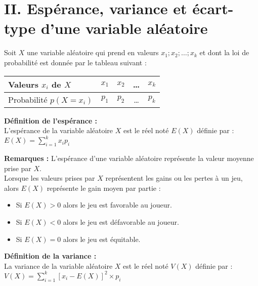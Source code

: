 \documentclass[11pt,a4paper]{article}
\begin{document}
\newpage

\section*{II. Espérance, variance et écart-type d'une variable aléatoire}

Soit $X$ une variable aléatoire qui prend en valeurs ${x_1;x_2;\dots;x_k}$ et dont la loi de probabilité est donnée par le tableau suivant :
\vspace{-12pt}

\begin{center}
    \renewcommand{\arraystretch}{1.6}
    \begin{tabular}{|l|c|c|c|c|}
        \hline
        Valeurs $x_i$ de $X$ & $x_1$      & $x_2$      & \quad\text{ }\dots\quad\text{ } & $x_k$      \\
        \hline
        Probabilité $p(X=x_i)$      & $p_1$ & $p_2$ & \quad\text{ }\dots\quad\text{ } & $p_k$ \\
        \hline
    \end{tabular}
\end{center}
\vspace*{8pt}

\begin{mdframed}[style=definitionStyle]
    \textbf{Définition de l'espérance :} ~\\
    L'espérance de la variable aléatoire $X$ est le réel noté $E(X)$ définie par :
    $\displaystyle E(X)=\sum_{i=1}^{k}x_ip_i$          
\end{mdframed}

\textbf{Remarques :} L'espérance d'une variable aléatoire représente la valeur moyenne prise par $X$. \\

Lorsque les valeurs prises par $X$ représentent les gains ou les pertes à un jeu, alors $E(X)$ représente le gain moyen par partie :
\vspace*{-4pt}
\begin{itemize}
    \item Si $E(X)>0$ alors le jeu est favorable au joueur.
    \item Si $E(X)<0$ alors le jeu est défavorable au joueur.
    \item Si $E(X)=0$ alors le jeu est équitable.
\end{itemize}


\begin{mdframed}[style=definitionStyle]
    \textbf{Définition de la variance :} ~\\
    La variance de la variable aléatoire $X$ est le réel noté $V(X)$ définie par :
    $\displaystyle V(X)=\sum_{i=1}^{k}\left[x_i-E(X)\right]^2\times p_i$
\end{mdframed}
\end{document}
